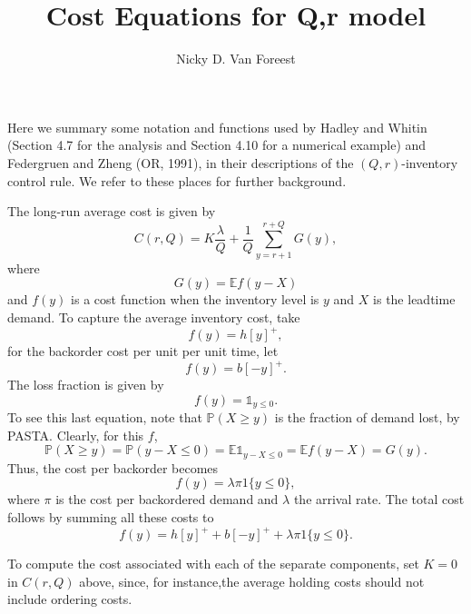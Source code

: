 \documentclass{article}
\title{Cost Equations for  Q,r model}
\author{Nicky D. Van Foreest}
\newcommand{\E}{\mathbb{E}}
\newcommand{\1}[1]{\mathbb{1}_{#1}}
\renewcommand{\P}{\mathbb{P}}
\begin{document}
\maketitle

Here we summary some notation and functions used by Hadley and Whitin
(Section 4.7 for the analysis and Section 4.10 for a numerical
example) and Federgruen and Zheng (OR, 1991), in their descriptions of
the $(Q,r)$-inventory control rule. We refer to these places for
further background.

The long-run average cost is given by
\begin{equation*}
  C(r, Q) = K \frac{\lambda}{Q} + \frac1Q \sum_{y=r+1}^{r+Q} G(y),
\end{equation*}
where
\begin{equation*}
  G(y) = \E f(y-X)
\end{equation*}
and $f(y)$ is a cost function when the inventory level is $y$ and $X$
is the leadtime demand. To capture the average inventory cost, take
\begin{equation*}
   f(y) = h [y]^+,
\end{equation*}
for the backorder cost per unit per unit time, let
\begin{equation*}
   f(y) = b [-y]^+.
\end{equation*}
The loss fraction is given by
\begin{equation*}
   f(y) = \1{y\leq 0}.
\end{equation*}
To see this last equation, note that $\P(X\geq y)$ is the
fraction of demand lost, by PASTA. Clearly, for this $f$,
\begin{equation*}
\P(X\geq y) = \P(y-X \leq 0) = \E \1{y-X\leq 0} = \E f(y-X) = G(y).
\end{equation*}
Thus,  the cost per backorder becomes
\begin{equation*}
   f(y) = \lambda \pi 1\{y\leq 0\},
\end{equation*}
where $\pi$ is the cost per backordered demand and $\lambda$ the
arrival rate. The total cost follows by summing all these costs to
\begin{equation*}
   f(y) = h [y]^+ + b[-y]^+ + \lambda \pi 1\{y\leq 0\}.
\end{equation*}


To compute the cost associated with each of the separate components,
set $K=0$ in $C(r,Q)$ above, since, for instance,the average holding
costs should not include ordering costs.
\end{document}
